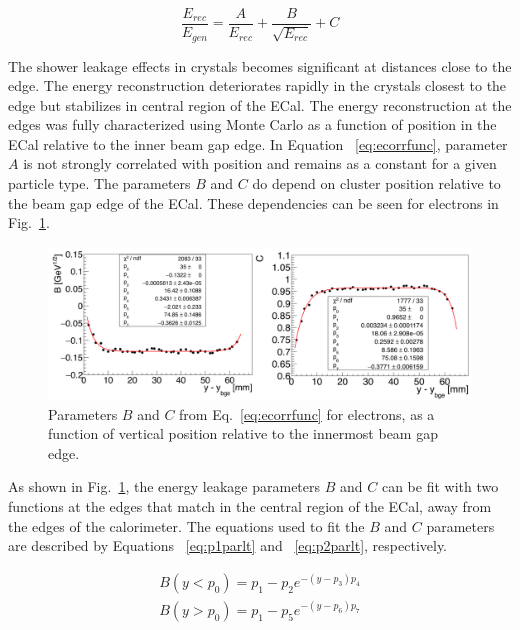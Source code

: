 \begin{equation}
	\label{eq:ecorrfunc}
	\dfrac{E_{rec}}{E_{gen}} = \dfrac{A}{E_{rec}}+\dfrac{B}{\sqrt{E_{rec}}}+C 
\end{equation}

The shower leakage effects in crystals becomes significant at distances close to the edge. The energy reconstruction deteriorates rapidly in the crystals closest to the edge but stabilizes in central region of the ECal. The energy reconstruction at the edges was fully characterized using Monte Carlo as a function of position in the ECal relative to the inner beam gap edge. In Equation ~\eqref{eq:ecorrfunc}, parameter $A$ is not strongly correlated with position and remains as a constant for a given particle type. The parameters $B$ and $C$  do depend on cluster position relative to the beam gap edge of the ECal. These dependencies can be seen for electrons in Fig.~\ref{Figure:sfparEdge}.

\begin{figure}[H]
  \centering
      \includegraphics[width=1.0\textwidth]{pics/performance/sfparEdgeFit.png}
  \caption[ECal energy shower parameters for electrons relative to the inside beam gap edge]{Parameters $B$ and $C$ from Eq.~\ref{eq:ecorrfunc} for electrons, as a function of vertical position
relative to the innermost beam gap edge.}
  \label{Figure:sfparEdge}
\end{figure}

As shown in Fig.~\ref{Figure:sfparEdge}, the energy leakage parameters $B$ and $C$ can be fit with two functions at the edges that match in the central region of the ECal, away from the edges of the calorimeter. The equations used to fit the $B$ and $C$ parameters are described by Equations ~\eqref{eq:p1parlt} and ~\eqref{eq:p2parlt}, respectively.

\begin{equation}
\begin{split}
\label{eq:p1parlt}
B(y<p_0) = p_1-p_2 e^{-(y-p_3)p_4}\\
B(y>p_0) = p_1-p_5 e^{-(y-p_6)p_7}
\end{split}
\end{equation}

